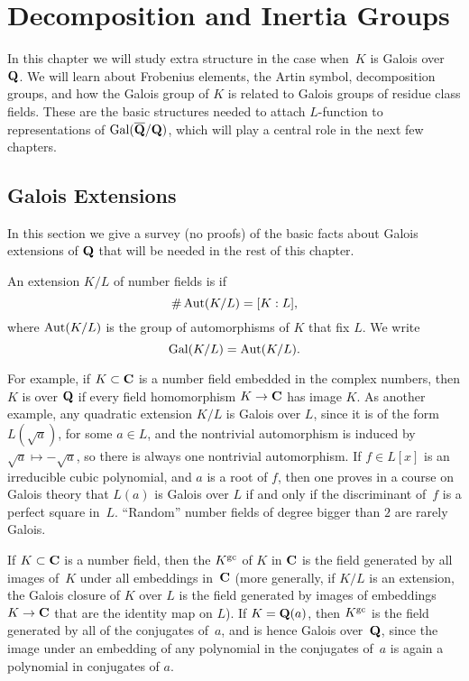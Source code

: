 \chapter{Decomposition and Inertia Groups}
In this chapter we will study extra structure in the case when~$K$
is Galois over~$\mathbf{Q}$.   We will learn about Frobenius elements,
the Artin symbol, decomposition groups, and how the Galois group of
$K$ is related to Galois groups of residue class fields.  These are
the basic structures needed to attach $L$-function to representations of
$\operatorname{Gal}(\overline{\mathbf{Q}}/\mathbf{Q})$, which will play a central role in the next few
chapters. 


\section{Galois Extensions}
In this section we give a survey (no proofs) of the basic facts about
Galois extensions of $\mathbf{Q}$ that will be needed in the rest of this
chapter.
\begin{definition}[Galois]
  An extension $K/L$ of number fields is  if $$\#\operatorname{Aut}(K/L)
  = [K:L],$$ where $\operatorname{Aut}(K/L)$ is the group of automorphisms of $K$
  that fix $L$.  We write $$\operatorname{Gal}(K/L) = \operatorname{Aut}(K/L).$$
\end{definition}
For example, if $K\subset \mathbf{C}$ is a number field embedded in the complex numbers, 
then $K$ is  over $\mathbf{Q}$ if
every field homomorphism $K\to \mathbf{C}$ has image $K$.
As another example, any quadratic extension
$K/L$ is Galois over $L$, since it is of the form $L(\sqrt{a})$, for some $a\in
L$, and the nontrivial automorphism is induced by $\sqrt{a}\mapsto
-\sqrt{a}$, so there is always one nontrivial automorphism.  If $f\in
L[x]$ is an irreducible cubic polynomial, and $a$ is a root of $f$,
then one proves in a course on Galois theory that $L(a)$ is Galois
over $L$ if and only if the discriminant of~$f$ is a perfect square
in~$L$.  ``Random'' number fields of degree bigger than $2$ are rarely
Galois.


If $K\subset \mathbf{C}$ is a number field, then the  $K^{\operatorname{gc}}$
of $K$ in $\mathbf{C}$ is the field generated by all images of~$K$ under all
embeddings in~$\mathbf{C}$ (more generally, if $K/L$ is an extension, the
Galois closure of $K$ over $L$ is the field generated by images of
embeddings $K\to \mathbf{C}$ that are the identity map on $L$).  If $K=\mathbf{Q}(a)$,
then $K^{\operatorname{gc}}$ is the field generated by all of the conjugates of~$a$, and is
hence Galois over~$\mathbf{Q}$, since the image under an embedding of any
polynomial in the conjugates of~$a$ is again a polynomial in
conjugates of $a$.


